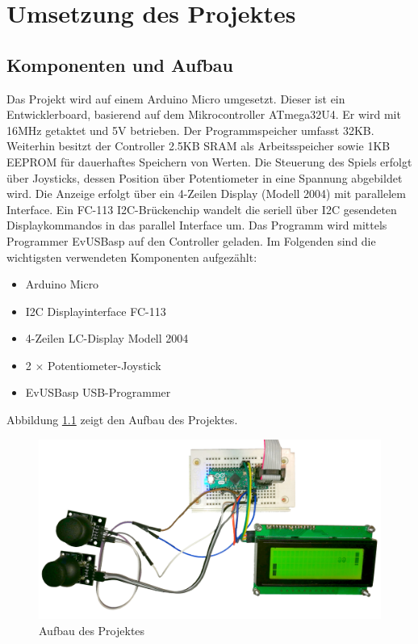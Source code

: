 \chapter{Umsetzung des Projektes}
\section{Komponenten und Aufbau}
\label{sec:Peri}
Das Projekt wird auf einem Arduino Micro umgesetzt. Dieser ist ein Entwicklerboard, basierend auf dem Mikrocontroller ATmega32U4. Er wird mit 16MHz getaktet und 5V betrieben. Der Programmspeicher umfasst 32KB. Weiterhin besitzt der Controller 2.5KB SRAM als Arbeitsspeicher sowie 1KB EEPROM für dauerhaftes Speichern von Werten.
Die Steuerung des Spiels erfolgt über Joysticks, dessen Position über Potentiometer in eine Spannung abgebildet wird. 
Die Anzeige erfolgt über ein 4-Zeilen Display (Modell 2004) mit parallelem Interface. Ein FC-113 I2C-Brückenchip wandelt die seriell über I2C gesendeten Displaykommandos in das parallel Interface um. Das Programm wird mittels Programmer EvUSBasp auf den Controller geladen. Im Folgenden sind die wichtigsten verwendeten Komponenten aufgezählt:
\begin{itemize}
\setlength\itemsep{-0.5em}
\item Arduino Micro
\item I2C Displayinterface FC-113 
\item 4-Zeilen LC-Display Modell 2004
\item 2 $\times$ Potentiometer-Joystick
\item EvUSBasp USB-Programmer
\end{itemize}

Abbildung \ref{fig:Aufbau} zeigt den Aufbau des Projektes.
\begin{figure}[H]
\includegraphics[width=\textwidth]{./Bilder/Aufbau.jpg}
\caption{Aufbau des Projektes}
\label{fig:Aufbau}
\end{figure}

